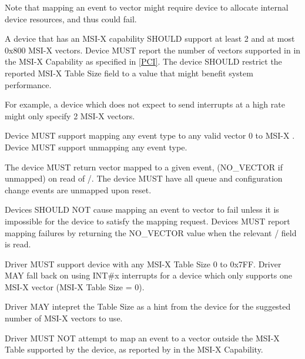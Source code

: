 Note that mapping an event to vector might require device to
allocate internal device resources, and thus could fail. 


A device that has an MSI-X capability SHOULD support at least 2
and at most 0x800 MSI-X vectors.
Device MUST report the number of vectors supported in
 in the MSI-X Capability as specified in
\hyperref[intro:PCI]{[PCI]}.
The device SHOULD restrict the reported MSI-X Table Size field
to a value that might benefit system performance.
\begin{note}
For example, a device which does not expect to send
interrupts at a high rate might only specify 2 MSI-X vectors.
\end{note}
Device MUST support mapping any event type to any valid
vector 0 to MSI-X .
Device MUST support unmapping any event type.

The device MUST return vector mapped to a given event,
(NO_VECTOR if unmapped) on read of /.
The device MUST have all queue and configuration change
events are unmapped upon reset.

Devices SHOULD NOT cause mapping an event to vector to fail
unless it is impossible for the device to satisfy the mapping
request.  Devices MUST report mapping
failures by returning the NO_VECTOR value when the relevant
/ field is read. 


Driver MUST support device with any MSI-X Table Size 0 to 0x7FF.
Driver MAY fall back on using INT\#x interrupts for a device
which only supports one MSI-X vector (MSI-X Table Size = 0).

Driver MAY intepret the Table Size as a hint from the device
for the suggested number of MSI-X vectors to use.

Driver MUST NOT attempt to map an event to a vector
outside the MSI-X Table supported by the device,
as reported by  in the MSI-X Capability.

